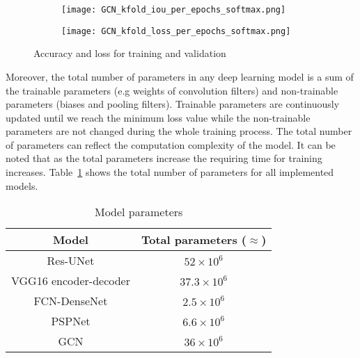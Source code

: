\begin{figure} [!h]
	\hfill
	\begin{subfigure}[b]{0.47\textwidth}
		\centering
		\texttt{[image: GCN\_kfold\_iou\_per\_epochs\_softmax.png]}
		\caption{}
		\label{fig:gcn_accuracy_metric}
	\end{subfigure}
	\hfill
	\begin{subfigure}[b]{0.47\textwidth}
		\centering
		\texttt{[image: GCN\_kfold\_loss\_per\_epochs\_softmax.png]}
		\caption{}
		\label{fig:gcn_loss_metric}
	\end{subfigure}
	\caption{Accuracy and loss for training and validation}
	\label{fig:accuracy_metric}
\end{figure} 
Moreover, the total number of parameters in any deep learning model is a sum of the trainable parameters (e.g weights of convolution filters) and non-trainable parameters (biases and pooling filters).
Trainable parameters are continuously updated until we reach the minimum loss value while the non-trainable parameters are not changed during the whole training process.
The total number of parameters can reflect the computation complexity of the model.
It can be noted that as the total parameters increase the requiring time for training increases.
Table~\ref{tab:table_parameters} shows the total number of parameters for all implemented models.
\begin{table}[]
	\centering
	\caption{Model parameters}
	\label{tab:table_parameters}
	\begin{tabular}{cc}\hline
		Model &  Total parameters (\(\approx\)) \\ \hline
		Res-UNet & \(52\times 10^6\) \\ 
		VGG16 encoder-decoder & \(37.3\times 10^6\)  \\
		FCN-DenseNet & \(2.5\times 10^6\) \\ 
		PSPNet & \(6.6\times 10^6\) \\ 
		GCN & \(36\times 10^6\) \\ \hline
	\end{tabular}
\end{table}

